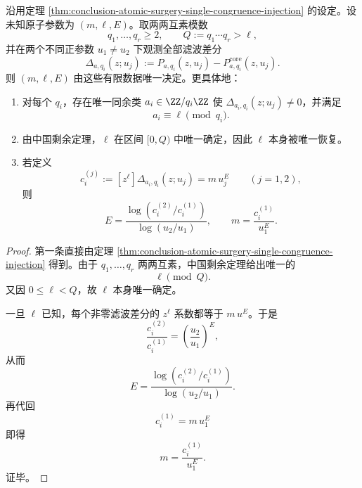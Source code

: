 \begin{theorem}\label{thm:conclusion-atomic-surgery-finite-congruence-tomography}
沿用定理 \ref{thm:conclusion-atomic-surgery-single-congruence-injection} 的设定。设未知原子参数为 \((m,\ell,E)\)。取两两互素模数
\[
q_1,\dots,q_r\ge 2,
\qquad
Q:=q_1\cdots q_r>\ell,
\]
并在两个不同正参数 \(u_1\neq u_2\) 下观测全部滤波差分
\[
\Delta_{a,q_i}(z;u_j):=
P_{a,q_i}(z,u_j)-P_{a,q_i}^{\mathrm{core}}(z,u_j).
\]
则 \((m,\ell,E)\) 由这些有限数据唯一决定。更具体地：
\begin{enumerate}
  \item 对每个 \(q_i\)，存在唯一同余类 \(a_i\in\ZZ/q_i\ZZ\) 使 \(\Delta_{a_i,q_i}(z;u_j)\neq 0\)，并满足
  \[
  a_i\equiv \ell\pmod{q_i}.
  \]
  \item 由中国剩余定理，\(\ell\) 在区间 \([0,Q)\) 中唯一确定，因此 \(\ell\) 本身被唯一恢复。
  \item 若定义
  \[
  c_i^{(j)}
  :=
  [z^\ell]\Delta_{a_i,q_i}(z;u_j)
  =
  m\,u_j^E
  \qquad (j=1,2),
  \]
  则
  \[
  \boxed{\;
  E=\frac{\log(c_i^{(2)}/c_i^{(1)})}{\log(u_2/u_1)},
  \qquad
  m=\frac{c_i^{(1)}}{u_1^E}.\;}
  \]
\end{enumerate}
\end{theorem}
\begin{proof}
第一条直接由定理 \ref{thm:conclusion-atomic-surgery-single-congruence-injection} 得到。由于 \(q_1,\dots,q_r\) 两两互素，中国剩余定理给出唯一的
\[
\ell \pmod Q.
\]
又因 \(0\le \ell<Q\)，故 \(\ell\) 本身唯一确定。

一旦 \(\ell\) 已知，每个非零滤波差分的 \(z^\ell\) 系数都等于 \(m\,u^E\)。于是
\[
\frac{c_i^{(2)}}{c_i^{(1)}}=\left(\frac{u_2}{u_1}\right)^E,
\]
从而
\[
E=\frac{\log(c_i^{(2)}/c_i^{(1)})}{\log(u_2/u_1)}.
\]
再代回
\[
c_i^{(1)}=m\,u_1^E
\]
即得
\[
m=\frac{c_i^{(1)}}{u_1^E}.
\]
证毕。
\end{proof}

